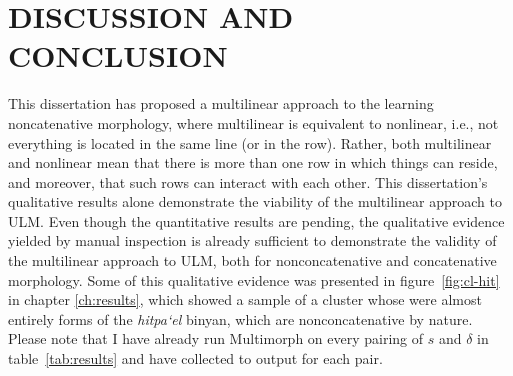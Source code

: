 \chapter{DISCUSSION AND CONCLUSION}


This dissertation has proposed a multilinear approach to the learning noncatenative morphology, where multilinear is 
equivalent to nonlinear, i.e., not everything is located in the same line (or in the row). Rather, both multilinear and nonlinear 
mean that there is more than one row in which things can reside, and moreover, that such rows can interact with each other.  
This dissertation’s qualitative results alone demonstrate the viability of the multilinear approach to ULM. Even though the quantitative results
are pending, the qualitative evidence yielded by manual inspection is already sufficient to demonstrate the validity of the 
multilinear approach to ULM, both for nonconcatenative and concatenative morphology. Some of this qualitative evidence was 
presented in figure~\ref{fig:cl-hit} in chapter \ref{ch:results}, which showed a sample of a cluster whose were almost entirely forms
of the \emph{hitpa`el} binyan, which are nonconcatenative by nature. Please note that I have already run Multimorph on every pairing of $s$ and $\delta$ in table~\ref{tab:results} and have collected to output for each pair.

